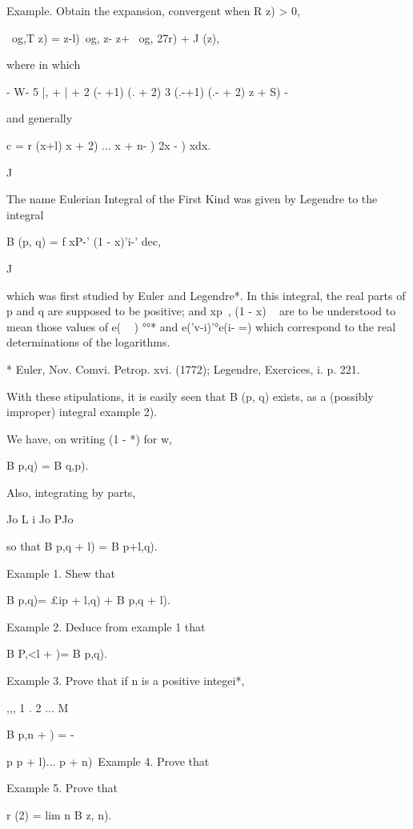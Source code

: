 Example. Obtain the expansion, convergent when R z) > 0,

\ og,T z) = z-l)\ og, z- z+ \ og, 27r) + J (z),

where in which

- W- 5 |, + | + 2 (- +1) (. + 2) 3 (.-+1) (.- + 2) z + S) -

and generally

c = r (x+l) x + 2) ... x + n- ) 2x - ) xdx. 

J


The name Eulerian Integral of the First Kind was given by Legendre to
the integral

B (p, q) = f xP-' (1 - x)'i-' dec,

J

which was first studied by Euler and Legendre*. In this integral, the
real parts of p and q are supposed to be positive; and xp~, (1 - x) ~
are to be understood to mean those values of e( ~ ) °°* and
e('v-i)'°e(i- =) which correspond to the real determinations of the
logarithms.

* Euler, Nov. Comvi. Petrop. xvi. (1772); Legendre, Exercices, i. p.
221.

%
%

With these stipulations, it is easily seen that B (p, q) exists, as a
(possibly improper) integral  example 2).

We have, on writing (1 - *) for w,

B p,q) = B q,p).

Also, integrating by parts,

Jo L i Jo PJo

so that B p,q + l) = B p+l,q).

Example 1. Shew that

B p,q)= £ip + l,q) + B p,q + l).

Example 2. Deduce from example 1 that

B P,<l + )= B p,q).

Example 3. Prove that if n is a positive integei*,

,,, 1 . 2 ... M

B p,n + ) = -

p p + l)... p + n)\ Example 4. Prove that

Example 5. Prove that

r (2) = lim n B z, n).


